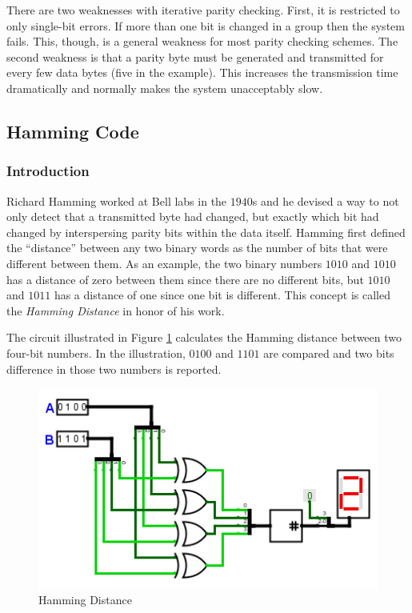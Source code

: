 There are two weaknesses with iterative parity checking. First, it is restricted to only single-bit errors. If more than one bit is changed in a group then the system fails. This, though, is a general weakness for most parity checking schemes. The second weakness is that a parity byte must be generated and transmitted for every few data bytes (five in the example). This increases the transmission time dramatically and normally makes the system unacceptably slow.

\subsection{Hamming Code}
\label{CL:subsec:hamming_code}

\subsubsection{Introduction}
\label{CL:subsubsec:introduction_to_hamming_code}

Richard Hamming worked at Bell labs in the $ 1940 $s and he devised a way to not only detect that a transmitted byte had changed, but exactly which bit had changed by interspersing parity bits within the data itself. Hamming first defined the ``distance'' between any two binary words as the number of bits that were different between them. As an example, the two binary numbers $ 1010 $ and $ 1010 $ has a distance of zero between them since there are no different bits, but $ 1010 $ and $ 1011 $ has a distance of one since one bit is different. This concept is called the \emph{Hamming Distance} in honor of his work.

The circuit illustrated in Figure \ref{fig:08_20} calculates the Hamming distance between two four-bit numbers. In the illustration, $ 0100 $ and $ 1101 $ are compared and two bits difference in those two numbers is reported.

\begin{figure}[H]
	\centering
	\includegraphics[width=\maxwidth{.95\linewidth}]{gfx/08_20}
	\caption{Hamming Distance}
	\label{fig:08_20}
\end{figure}

